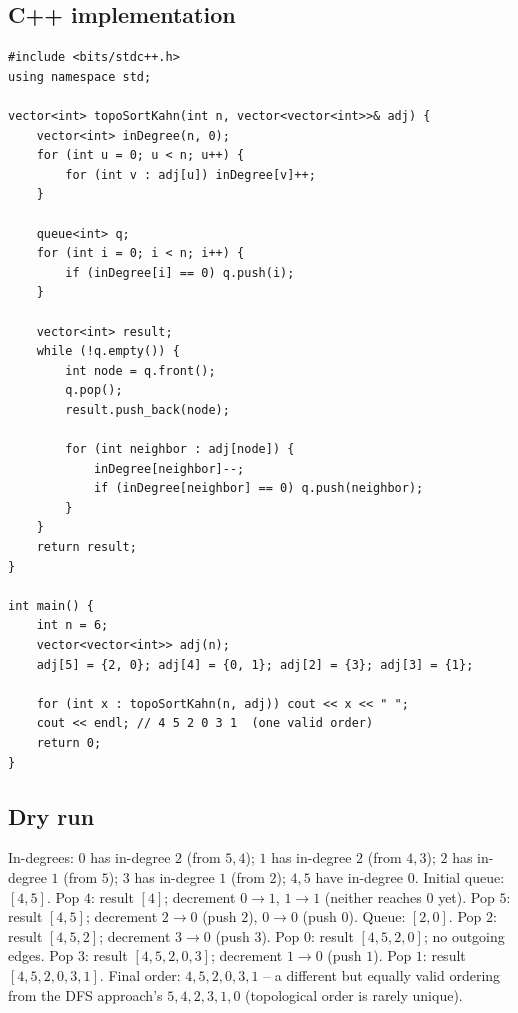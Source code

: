 \subsection*{C++ implementation}

\begin{lstlisting}
#include <bits/stdc++.h>
using namespace std;

vector<int> topoSortKahn(int n, vector<vector<int>>& adj) {
    vector<int> inDegree(n, 0);
    for (int u = 0; u < n; u++) {
        for (int v : adj[u]) inDegree[v]++;
    }

    queue<int> q;
    for (int i = 0; i < n; i++) {
        if (inDegree[i] == 0) q.push(i);
    }

    vector<int> result;
    while (!q.empty()) {
        int node = q.front();
        q.pop();
        result.push_back(node);

        for (int neighbor : adj[node]) {
            inDegree[neighbor]--;
            if (inDegree[neighbor] == 0) q.push(neighbor);
        }
    }
    return result;
}

int main() {
    int n = 6;
    vector<vector<int>> adj(n);
    adj[5] = {2, 0}; adj[4] = {0, 1}; adj[2] = {3}; adj[3] = {1};

    for (int x : topoSortKahn(n, adj)) cout << x << " ";
    cout << endl; // 4 5 2 0 3 1  (one valid order)
    return 0;
}
\end{lstlisting}

\subsection*{Dry run}


In-degrees: $0$ has in-degree $2$ (from $5,4$); $1$ has in-degree $2$
(from $4,3$); $2$ has in-degree $1$ (from $5$); $3$ has in-degree $1$
(from $2$); $4,5$ have in-degree $0$. Initial queue: $[4,5]$. Pop $4$:
result $[4]$; decrement $0\to1$, $1\to1$ (neither reaches $0$ yet).
Pop $5$: result $[4,5]$; decrement $2\to0$ (push $2$), $0\to0$ (push
$0$). Queue: $[2,0]$. Pop $2$: result $[4,5,2]$; decrement $3\to0$
(push $3$). Pop $0$: result $[4,5,2,0]$; no outgoing edges. Pop $3$:
result $[4,5,2,0,3]$; decrement $1\to0$ (push $1$). Pop $1$: result
$[4,5,2,0,3,1]$. Final order: $4,5,2,0,3,1$ -- a different but equally
valid ordering from the DFS approach's $5,4,2,3,1,0$ (topological
order is rarely unique).

